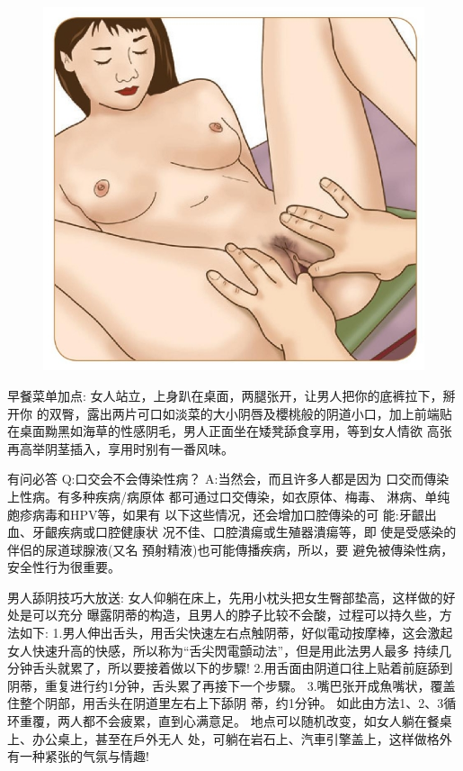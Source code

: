 \documentclass[12pt,UTF8]{ctexbook}
\begin{document}
\begin{figure}[htbp]
	\centering
	\includegraphics[width=0.7\linewidth]{23}
	\caption{}
	\label{fig:1}
\end{figure}

早餐菜单加点:
女人站立，上身趴在桌面，两腿张开，让男人把你的底裤拉下，掰开你
的双臀，露出两片可口如淡菜的大小阴唇及櫻桃般的阴道小口，加上前端贴
在桌面黝黑如海草的性感阴毛，男人正面坐在矮凳舔食享用，等到女人情欲
高张再高举阴茎插入，享用时别有一番风味。

有问必答
Q:口交会不会傳染性病？
A:当然会，而且许多人都是因为
口交而傳染上性病。有多种疾病/病原体
都可通过口交傳染，如衣原体、梅毒、
淋病、单纯皰疹病毒和HPV等，如果有
以下这些情况，还会增加口腔傳染的可
能:牙齦出血、牙齦疾病或口腔健康状
况不佳、口腔潰瘍或生殖器潰瘍等，即
使是受感染的伴侣的尿道球腺液(又名
預射精液)也可能傳播疾病，所以，要
避免被傳染性病，安全性行为很重要。

男人舔阴技巧大放送:
女人仰躺在床上，先用小枕头把女生臀部垫高，这样做的好处是可以充分
曝露阴蒂的构造，且男人的脖子比较不会酸，过程可以持久些，方法如下:
1.男人伸出舌头，用舌尖快速左右点触阴蒂，好似電动按摩棒，这会激起
女人快速升高的快感，所以称为“舌尖閃電顫动法”，但是用此法男人最多
持续几分钟舌头就累了，所以要接着做以下的步驟!
2.用舌面由阴道口往上贴着前庭舔到阴蒂，重复进行约1分钟，舌头累了再接下一个步驟。
3.嘴巴张开成魚嘴状，覆盖住整个阴部，用舌头在阴道里左右上下舔阴
蒂，约1分钟。
如此由方法1、2、3循环重覆，两人都不会疲累，直到心满意足。
地点可以随机改变，如女人躺在餐桌上、办公桌上，甚至在戶外无人
处，可躺在岩石上、汽車引擎盖上，这样做格外有一种紧张的气氛与情趣!
\end{document}
